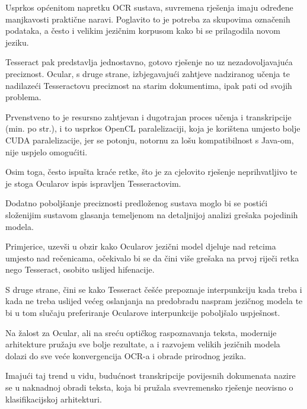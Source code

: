 \documentclass[zavrsnirad]{fer}
\begin{document}
Usprkos općenitom napretku OCR sustava, suvremena rješenja imaju određene manjkavosti praktične naravi. Poglavito to je potreba za skupovima označenih podataka, a često i velikim jezičnim korpusom kako bi se prilagodila novom jeziku.

Tesseract pak predstavlja jednostavno, gotovo rješenje no uz nezadovoljavajuća preciznost. Ocular, s druge strane, izbjegavajući zahtjeve nadziranog učenja te nadilazeći Tesseractovu preciznost na starim dokumentima, ipak pati od svojih problema.

Prvenstveno to je resursno zahtjevan i dugotrajan proces učenja i transkripcije (min. po str.), i to usprkos OpenCL paralelizaciji, koja je korištena umjesto bolje CUDA paralelizacije, jer se potonju, notornu za lošu kompatibilnost s Java-om, nije uspjelo omogućiti.

Osim toga, često ispušta kraće retke, što je za cjelovito rješenje neprihvatljivo te je stoga Ocularov ispis ispravljen Tesseractovim.

Dodatno poboljšanje preciznosti predloženog sustava moglo bi se postići složenijim sustavom glasanja temeljenom na detaljnijoj analizi grešaka pojedinih modela.

Primjerice, uzevši u obzir kako Ocularov jezični model djeluje nad retcima umjesto nad rečenicama, očekivalo bi se da čini više grešaka na prvoj riječi retka nego Tesseract, osobito uslijed hifenacije.

S druge strane, čini se kako Tesseract češće prepoznaje interpunkciju kada treba i kada ne treba uslijed većeg oslanjanja na predobradu naspram jezičnog modela te bi u tom slučaju preferiranje Ocularove interpunkcije poboljšalo uspješnost.

Na žalost za Ocular, ali na sreću optičkog raspoznavanja teksta, modernije arhitekture pružaju sve bolje rezultate, a i razvojem velikih jezičnih modela dolazi do sve veće konvergencija OCR-a i obrade prirodnog jezika.

Imajući taj trend u vidu, budućnost transkripcije povijesnih dokumenata nazire se u naknadnoj obradi teksta, koja bi pružala svevremensko rješenje neovisno o klasifikacijskoj arhitekturi.




\end{document}
